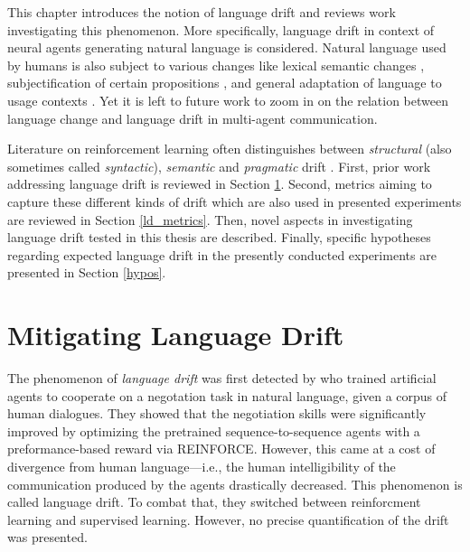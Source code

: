 This chapter introduces the notion of language drift and reviews work investigating this phenomenon. More specifically, language drift in context of neural agents generating natural language is considered. Natural language used by humans is also subject to various changes like lexical semantic changes \parencite{blank1999new}, subjectification of certain propositions \parencite{traugott1989rise},  and general adaptation of language to usage contexts \parencite{five2009language}. Yet it is left to future work to zoom in on the relation between language change and language drift in multi-agent communication. 

Literature on reinforcement learning often distinguishes between \textit{structural} (also sometimes called \textit{syntactic}), \textit{semantic} and \textit{pragmatic} drift \parencite{lazaridou2020multi}.
First, prior work addressing language drift is reviewed in Section \ref{ld_mitigation}. Second, metrics aiming to capture these different kinds of drift which are also used in presented experiments are reviewed in Section \ref{ld_metrics}. Then, novel aspects in investigating language drift tested in this thesis are described. Finally, specific hypotheses regarding expected language drift in the presently conducted experiments are presented in Section \ref{hypos}. 

\section{Mitigating Language Drift}
\label{ld_mitigation}
The phenomenon of \textit{language drift} was first detected by \cite{lewis2017deal} who trained artificial agents to cooperate on a negotation task in natural language, given a corpus of human dialogues. They showed that the negotiation skills were significantly improved by optimizing the pretrained sequence-to-sequence agents with a preformance-based reward via REINFORCE. However, this came at a cost of divergence from human language---i.e., the human intelligibility of the communication produced by the agents drastically decreased. This phenomenon is called language drift. To combat that, they switched between reinforcment learning and supervised learning. However, no precise quantification of the drift was presented. 

